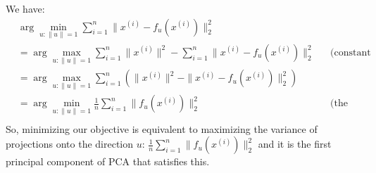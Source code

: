 \begin{answer}
We have:
\begin{align}
	&\arg\min_{u:\|u\|=1} \sum_{i=1}^n \|x^{(i)}-f_u(x^{(i)})\|_2^2 \\
	&= \arg\max_{u:\|u\|=1} \sum_{i=1}^n \|x^{(i)}\|^2 - \sum_{i=1}^n \|x^{(i)}-f_u(x^{(i)})\|_2^2 &&\text{(constant first summation)} \\
	&= \arg\max_{u:\|u\|=1} \sum_{i=1}^n \left(\|x^{(i)}\|^2 -  \|x^{(i)}-f_u(x^{(i)})\|_2^2\right) \\
	&= \arg\min_{u:\|u\|=1} \frac{1}{n} \sum_{i=1}^n \|f_u(x^{(i)})\|_2^2 &&\text{(the Pythagorean theorem)} \\
\end{align}
So, minimizing our objective is equivalent to maximizing the variance of projections onto the direction $u$: $\frac{1}{n} \sum_{i=1}^n \|f_u(x^{(i)})\|_2^2$ and it is the first principal component of PCA that satisfies this.
\end{answer}
